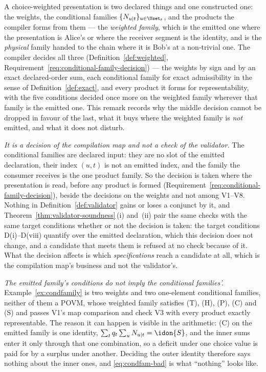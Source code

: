 \begin{remark}\label{rem:condfamily}
A choice-weighted presentation is two declared things and one constructed one:
the weights, the conditional families $\{N_{u|t}\}_{u\in\Uset_t}$, and the
products the compiler forms from them --- the \emph{weighted family}, which is
the emitted one where the presentation is Alice's or where the receiver segment
is the identity, and is the \emph{physical} family handed to the chain where it
is Bob's at a non-trivial one. The compiler decides all three
(Definition~\ref{def:weighted},
Requirement~\ref{req:conditional-family-decision}) --- the weights by sign and
by an exact declared-order sum, each conditional family for exact
admissibility in the sense of Definition~\ref{def:exact}, and every product it
forms for representability, with the five conditions decided once more on the
weighted family wherever that family is the emitted one. This remark records
why the middle decision cannot be dropped in favour of the last, what it buys
where the weighted family is \emph{not} emitted, and what it does not disturb.

\emph{It is a decision of the compilation map and not a check of the
validator.} The conditional families are declared input: they are no slot of
the emitted declaration, their index $(u,t)$ is not an emitted index, and the
family the consumer receives is the one product family. So the decision is
taken where the presentation is read, before any product is formed
(Requirement~\ref{req:conditional-family-decision}), beside the decisions on the weights and not
among V1--V8. Nothing in Definition~\ref{def:validator} gains or loses a
conjunct by it, and Theorem~\ref{thm:validator-soundness}\,(i) and~(ii) pair the same checks
with the same target conditions whether or not the decision is taken: the
target conditions D(i)--D(viii) quantify over the emitted declaration, which
this decision does not change, and a candidate that meets them is refused at
no check because of it. What the decision affects is which
\emph{specifications} reach a candidate at all, which is the compilation map's
business and not the validator's.

\emph{The emitted family's conditions do not imply the conditional families'.}
Example~\ref{ex:condfamily} is two weights and two one-element conditional
families, neither of them a POVM, whose weighted family satisfies (T), (H),
(P), (C) and (S) and passes V1's map comparison and check V3 with every product
exactly representable.
The reason it can happen is visible in the arithmetic: (C) on the emitted
family is one identity, $\sum_{t}q_t\sum_uN_{u|t}=\idon{S}$, and the inner sums
enter it only through that one combination, so a deficit under one choice value
is paid for by a surplus under another. Deciding the outer identity therefore
says nothing about the inner ones, and \eqref{eq:condfam-bad} is what ``nothing''
looks like.


\end{remark}

